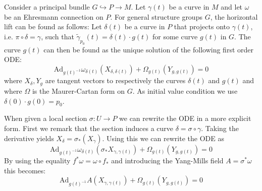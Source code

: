 	\begin{method}
		Consider a principal bundle $G\hookrightarrow P\rightarrow M$. Let $\gamma(t)$ be a curve in $M$ and let $\omega$ be an Ehresmann connection on $P$. For general structure groups $G$, the horizontal lift can be found as follows: Let $\delta(t)$ be a curve in $P$ that projects onto $\gamma(t)$, i.e. $\pi\circ\delta=\gamma$, such that $\widetilde\gamma_{p_0}(t)=\delta(t)\cdot g(t)$ for some curve $g(t)$ in $G$. The curve $g(t)$ can then be found as the unique solution of the following first order ODE:
		\begin{equation}
			\label{diff:prin:horizontal_ode}
			\text{Ad}_{g(t)^{-1}}\omega_{\delta(t)}(X_{\delta, \delta(t)}) + \Omega_{g(t)}(Y_{g, g(t)}) = 0
		\end{equation}
		where $X_\delta, Y_g$ are tangent vectors to respectively the curves $\delta(t)$ and $g(t)$ and where $\Omega$ is the Maurer-Cartan form on $G$. As initial value condition we use $\delta(0)\cdot g(0) = p_0$.
	\end{method}
	\begin{remark}
		When given a local section $\sigma:U\rightarrow P$ we can rewrite the ODE in a more explicit form. First we remark that the section induces a curve $\delta = \sigma\circ\gamma$. Taking the derivative yields $X_\delta = \sigma_*(X_\gamma)$. Using this we can rewrite the ODE as
		\begin{equation}
			\text{Ad}_{g(t)^{-1}}\omega_{\delta(t)}(\sigma_*X_{\gamma, \gamma(t)}) + \Omega_{g(t)}(Y_{g, g(t)}) = 0
		\end{equation}
		By using the equality $f^*\omega = \omega\circ f_*$ and introducing the Yang-Mills field $A = \sigma^*\omega$ this becomes:
		\begin{equation}
			\text{Ad}_{g(t)^{-1}}A(X_{\gamma, \gamma(t)}) + \Omega_{g(t)}(Y_{g, g(t)}) = 0
		\end{equation}
	\end{remark}
	
